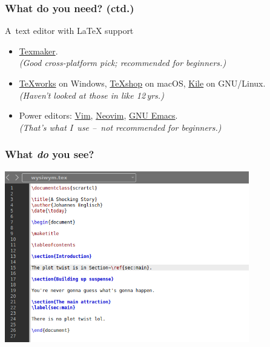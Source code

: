 \documentclass[a4paper,12pt]{beamer}
\begin{document}
\begin{frame}
  \frametitle{What do you need? (ctd.)}

  \begin{block}{A~text editor with \LaTeX{} support}
    \begin{itemize}
      \item \href{https://www.xm1math.net/texmaker/}{Texmaker}.\\
        \emph{(Good cross-platform pick; recommended for beginners.)}
      \item
        \href{https://tug.org/texworks/}{\TeX{}works} on Windows,
        \href{https://pages.uoregon.edu/koch/texshop/}{\TeX{}shop} on macOS,
        \href{https://kile.sourceforge.io/}{Kile} on GNU/Linux.\\
        \emph{(Haven't looked at those in like 12\,yrs.)}
      \item Power editors:
        \href{https://www.vim.org/}{Vim},
        \href{https://neovim.io/}{Neovim},
        \href{https://www.gnu.org/software/emacs/}{GNU Emacs}.\\
        \emph{(That's what I~use --~not recommended for beginners.)}
    \end{itemize}
  \end{block}
\end{frame}

\begin{frame}
  \frametitle{What \emph{do} you see?}

  \begin{center}
    \includegraphics[width=0.8\textwidth]{images/code-snippet.png}
  \end{center}
\end{frame}
\end{document}
